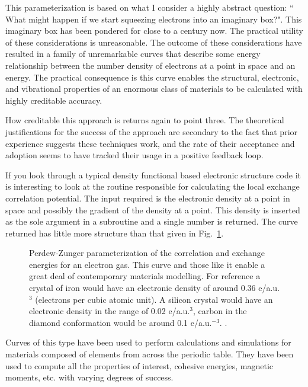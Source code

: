This parameterization is based on what I consider a highly abstract question: ``
What might happen if we start squeezing electrons into an imaginary box?".
This imaginary box has been pondered for close to a century now. The practical utility of these considerations is unreasonable. 
The outcome of these considerations have resulted in a family of unremarkable curves that describe some energy relationship between
the number density of electrons at a point in space and an energy. The practical consequence is this curve enables the
structural, electronic, and vibrational properties of an enormous class of materials to be calculated with highly creditable accuracy.

How creditable this approach is returns again to point three. The theoretical justifications for the success of the approach are
secondary to the fact that prior experience suggests these techniques work, and the rate of their acceptance and adoption
seems to have tracked their usage in a positive feedback loop. 

If you look through a typical density functional based electronic structure code it is interesting to look at the routine
responsible for calculating the local exchange correlation potential. The input required is the 
electronic density at a point in space and possibly the gradient of the density at a point. This 
density is inserted as the sole argument in a subroutine and a single number is returned. The curve
returned has little more structure than that given in Fig.~\ref{fig:ldapz}. 
%
\begin{figure}
\begin{center}
\graphicspath{{./intro/}}
\caption{Perdew-Zunger parameterization of the correlation and exchange energies for an electron gas.
This curve and those like it enable a great deal of contemporary materials modelling. For reference
a crystal of iron would have an electronic density of around 0.36 e/a.u.$^{3}$ (electrons per cubic
atomic unit). A silicon crystal would have an electronic density in the range of 0.02 e/a.u.$^{3}$,
carbon in the diamond conformation would be around 0.1 e/a.u.$^{-3}$.  
\label{fig:ldapz}.}
\end{center}
\end{figure}
%
Curves of this type have been used to perform calculations and simulations for 
materials composed of elements from across the periodic table. They have been
used to compute all the properties of interest, cohesive energies, magnetic moments,
etc. with varying degrees of success.

